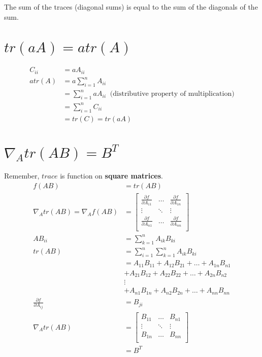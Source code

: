 \documentclass[a4paper, 12pt]{article}
\begin{document}
The sum of the traces (diagonal sums) is equal to the sum of the diagonals of the sum.

\section{\(tr(aA) = atr(A) \)}
\begin{align*}
C_{ii} &= aA_{ii}\\
atr(A) &=a \sum_{i=1}^nA_{ii}\\
&= \sum_{i=1}^naA_{ii} \;\; \text{(distributive property of multiplication)}\\
&= \sum_{i=1}^nC_{ii}\\
&= tr(C) = tr(aA)
\end{align*}

\section{ \(\nabla_{A}tr(AB) = B^{T}\)}
Remember, $trace$ is function on \textbf{square matrices}.
\begin{align}
f(AB) &= tr(AB)\\
\nabla_{A}tr(AB) = \nabla_{A}f(AB) &= \left[
\begin{matrix}
\frac{\partial f}{\partial A_{11}} & \ldots & \frac{\partial f}{\partial A_{1n}}\\
\vdots & \ddots & \vdots\\
\frac{\partial f}{\partial A_{n1}} & \ldots & \frac{\partial f}{\partial A_{nn}}\\
\end{matrix}
\right]\\
AB_{ii} &= \sum_{k=1}^nA_{ik}B_{ki} \\
tr(AB) &= \sum_{i=1}^{n}\sum_{k=1}^nA_{ik}B_{ki} \\
&= A_{11}B_{11} + A_{12}B_{21} + \ldots + A_{1n}B_{n1}\\
&+ A_{21}B_{12} + A_{22}B_{22} + \ldots + A_{2n}B_{n2}\\
& \vdots\\
&+ A_{n1}B_{1n} + A_{n2}B_{2n} + \ldots + A_{nn}B_{nn}\\
\frac{\partial f}{\partial A_{ij}} &= B_{ji}\\
\nabla_{A}tr(AB) &= \left[
\begin{matrix}
B_{11} & \ldots & B_{n1}\\
\vdots & \ddots & \vdots\\
B_{1n} & \ldots & B_{nn}\\
\end{matrix}
\right]\\
&= B^{T}\\
\end{align}
\end{document}

